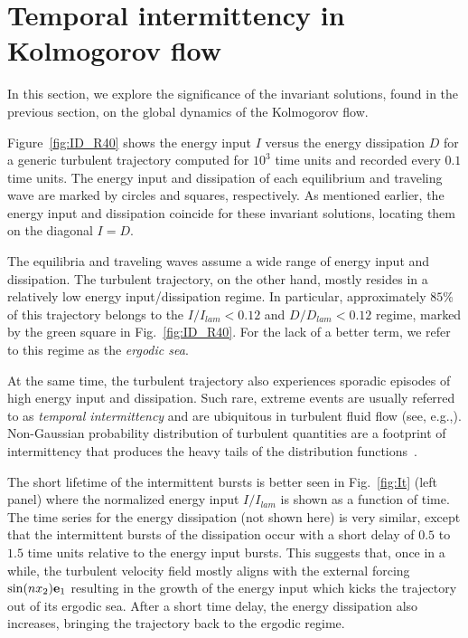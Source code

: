 \documentclass{article}
\begin{document}
\section{Temporal intermittency in Kolmogorov flow}\label{sec:interm}
In this section, we explore the significance of the invariant solutions, 
found in the previous section,
on the global dynamics of the Kolmogorov flow.

Figure~\ref{fig:ID_R40} shows the energy input $I$ versus the energy dissipation $D$
for a generic turbulent trajectory computed for $10^3$ time units
and recorded every $0.1$ time units.
The energy input
and dissipation of each equilibrium and traveling wave are marked by circles and squares,
respectively. As mentioned earlier, the energy input and dissipation coincide for these invariant
solutions, locating them on the diagonal $I=D$.

The equilibria and traveling waves assume a wide range of energy input and dissipation.
The turbulent trajectory, on the other hand,
mostly resides in a relatively low energy input/dissipation
regime. In particular, approximately $85\%$ of this trajectory belongs to the $I/I_{lam}<0.12$ and
$D/D_{lam}<0.12$ regime, marked by the green square in Fig.~\ref{fig:ID_R40}. For the lack
of a better term, we refer to this regime as the \emph{ergodic sea}.

At the same time, the turbulent trajectory also experiences sporadic episodes of high energy input
and dissipation. Such rare, extreme events are usually referred to as \emph{temporal intermittency}
and are ubiquitous in turbulent fluid flow (see, e.g.,).
Non-Gaussian probability distribution of
turbulent quantities are a footprint of intermittency that produces the
heavy tails of the distribution functions~\citep{mini10}.

The short lifetime of the intermittent bursts is better seen in Fig.~\ref{fig:It}
(left panel) where the normalized energy input $I/I_{lam}$ is shown
as a function of time. The time series for the energy dissipation
(not shown here) is very similar, except that the intermittent bursts of
the dissipation occur with a short delay of $0.5$ to $1.5$ time units
relative to the energy input bursts. This suggests that, once in a while,
the turbulent velocity field mostly aligns with the external forcing $\sin(nx_2)\mathbf e_1$
resulting in the growth of the energy input which kicks the
trajectory out of its ergodic sea. After a short time delay, the energy
dissipation also increases, bringing the trajectory back to the ergodic regime.
\end{document}
